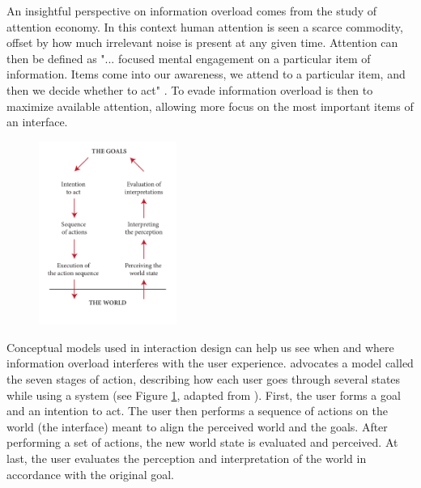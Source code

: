 An insightful perspective on information overload comes from the study of attention economy. 
In this context human attention is seen a scarce commodity, offset by how much irrelevant noise is present at any given time. 
Attention can then be defined as "... focused mental engagement on a particular item of information. 
Items come into our awareness, we attend to a particular item, and then we decide whether to act" 
\citep{Davenport2001}. 
To evade information overload is then to maximize available attention, allowing more focus on the most important items of an interface.

\begin{figure}
  \vspace{-20pt}
  \begin{center}
    \includegraphics[width=0.4\textwidth]{../graphics/seven-stages.pdf}
    \vspace{-20pt}
    \caption[The Seven Stages of Action]{}
  \end{center}
  \label{fig:seven-stages}
  \vspace{-30pt}
\end{figure}

Conceptual models used in interaction design can help us see when and where information overload interferes with the user experience. 
\cite{Norman1988} advocates a model called the seven stages of action, describing how each user goes through several states while using a system
(see Figure \ref{fig:seven-stages}, adapted from \citeauthor{Norman1988}). 
First, the user forms a goal and an intention to act. The user then performs a sequence of actions on the world (the interface)
 meant to align the perceived world and the goals. After performing a set of actions, the new world state is evaluated and perceived. 
At last, the user evaluates the perception and interpretation of the world in accordance with the original goal.

